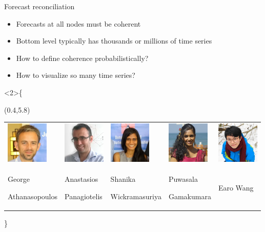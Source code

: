 \documentclass[14pt]{beamer}
\begin{document}
\begin{frame}{Forecast reconciliation}

\begin{itemize}
\item
  Forecasts at all nodes must be coherent
\item
  Bottom level typically has thousands or millions of time series
\item
  How to define coherence probabilistically?
\item
  How to visualize so many time series?
\end{itemize}

\vspace*{10cm}

\only\textless{}2\textgreater{}\{

\begin{textblock}{12}(0.4,5.8)
\begin{block}{}
\fontsize{9}{9}\sf
\begin{tabular}{p{}p{}p{}p{}p{}}
\includegraphics[height=2cm]{figs/george} &
\includegraphics[height=2cm]{figs/tas} &
\includegraphics[height=2cm]{figs/shanika} &
\includegraphics[height=2cm]{figs/puwasala} &
\includegraphics[height=2cm]{figs/earowang} \\
George\par Athanasopoulos &
Anastasios\par Panagiotelis &
Shanika\par Wickramasuriya & Puwasala\par Gamakumara & Earo Wang
\end{tabular}
\end{block}
\end{textblock}

\}

\end{frame}
\end{document}
